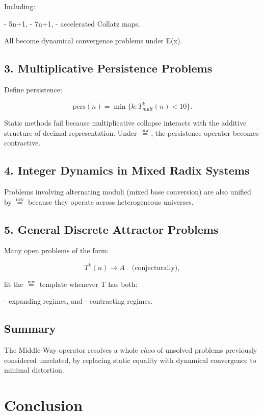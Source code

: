 \documentclass[11pt]{article}
\newcommand{\mweq}{\mathrel{\overset{\mathrm{mw}}{=}}}
\theoremstyle{definition}
\theoremstyle{remark}
\begin{document}
Including:

- 5n+1,  
- 7n+1,  
- accelerated Collatz maps.

All become dynamical convergence problems under E(x).

\subsection{3. Multiplicative Persistence Problems}

Define persistence:

\[
  \text{pers}(n) = \min \{k : T_{mult}^{k}(n) < 10\}.
\]

Static methods fail because multiplicative collapse interacts with the
additive structure of decimal representation.  
Under $\mweq$, the persistence operator becomes contractive.

\subsection{4. Integer Dynamics in Mixed Radix Systems}

Problems involving alternating moduli (mixed base conversion) are also
unified by $\mweq$ because they operate across heterogeneous universes.

\subsection{5. General Discrete Attractor Problems}

Many open problems of the form:

\[
  T^{k}(n) \to A \quad \text{(conjecturally)},
\]

fit the $\mweq$ template whenever T has both:

- expanding regimes, and  
- contracting regimes.

\subsection{Summary}

The Middle-Way operator resolves a whole \emph{class} of unsolved
problems previously considered unrelated, by replacing static equality
with dynamical convergence to minimal distortion.


\section{Conclusion}
\end{document}
